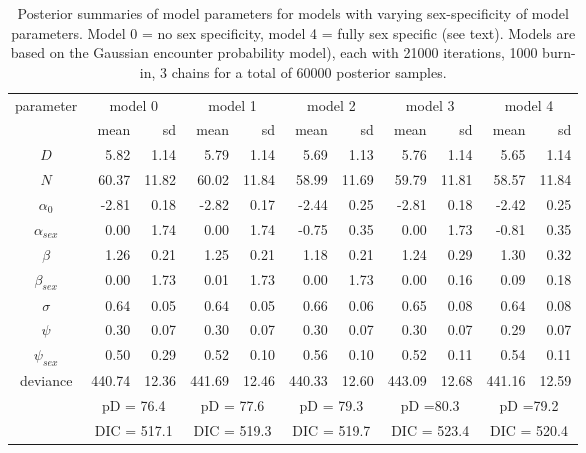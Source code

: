 \begin{table}[htp]
\centering
\caption{
Posterior summaries of model parameters for models with varying
sex-specificity of model parameters. Model 0 = no sex specificity,
model 4 = fully sex specific (see text). 
Models are based on the 
 Gaussian encounter probability model), each with 21000 iterations,
 1000 burn-in, 3 chains for a total of 60000 posterior samples. 
}
\begin{tabular}{crrrrrrrrrr} \hline \hline
parameter & \multicolumn{2}{c}{model 0} &
\multicolumn{2}{c}{model 1} &
\multicolumn{2}{c}{model 2} &
\multicolumn{2}{c}{model 3} &
\multicolumn{2}{c}{model 4}  \\
        &    mean &   sd &      mean &   sd &      mean &   sd &        mean&     sd  & mean & sd\\ \hline
$D$      &     5.82 & 1.14 &  5.79&  1.14&   5.69&  1.13&   5.76&  1.14& 5.65&  1.14 \\
$N$     &     60.37 &11.82 & 60.02& 11.84&  58.99& 11.69&  59.79& 11.81&58.57& 11.84 \\
$\alpha_0$   &   -2.81 & 0.18 & -2.82&  0.17&  -2.44&  0.25&  -2.81&  0.18&-2.42&  0.25 \\
$\alpha_{sex}$ &  0.00 & 1.74 &  0.00&  1.74&  -0.75&  0.35&   0.00&  1.73&-0.81&  0.35 \\
$\beta$        &1.26 & 0.21 &  1.25&  0.21&   1.18&  0.21&   1.24&  0.29&1.30&  0.32 \\
$\beta_{sex} $   &0.00 & 1.73 &  0.01&  1.73&   0.00&  1.73&   0.00&  0.16&0.09&  0.18 \\
$\sigma$       &0.64 & 0.05 &  0.64&  0.05&   0.66&  0.06&   0.65&  0.08&0.64&  0.08 \\
$\psi$         &0.30 & 0.07 &  0.30&  0.07&   0.30&  0.07&   0.30&  0.07&0.29&  0.07 \\
$\psi_{sex}$    &0.50 & 0.29 &  0.52&  0.10&   0.56&  0.10&   0.52&  0.11&0.54&  0.11 \\
deviance   &440.74 &12.36 &441.69& 12.46& 440.33& 12.60& 443.09& 12.68&441.16& 12.59 \\ \hline
  & \multicolumn{2}{c}{pD = 76.4} &\multicolumn{2}{c}{pD = 77.6} & \multicolumn{2}{c}{pD = 79.3}
& \multicolumn{2}{c}{pD =80.3}  & \multicolumn{2}{c}{pD =79.2}  \\
& \multicolumn{2}{c}{DIC = 517.1} & \multicolumn{2}{c}{DIC = 519.3} &
\multicolumn{2}{c}{DIC = 519.7} &    \multicolumn{2}{c}{DIC = 523.4} &
\multicolumn{2}{c}{DIC = 520.4} \\ \hline
\end{tabular}
\label{gof.tab.dic}
\end{table}





